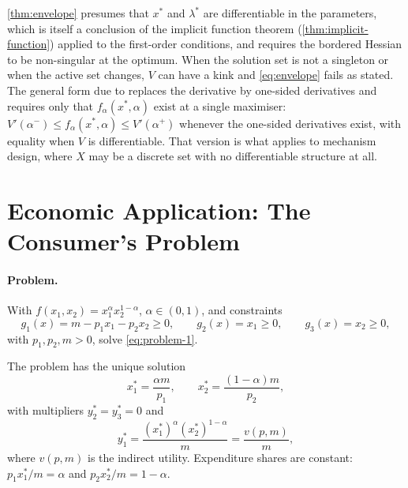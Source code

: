 \begin{remark}
	\label{rem:envelope-caveats}
	\autoref{thm:envelope} presumes that $x^\ast$ and $\lambda^\ast$ are
	differentiable in the parameters, which is itself a conclusion of the implicit
	function theorem (\autoref{thm:implicit-function}) applied to the first-order
	conditions, and requires the bordered Hessian to be non-singular at the optimum.
	When the solution set is not a singleton or when the active set changes, $V$ can
	have a kink and \eqref{eq:envelope} fails as stated. The general form due to
	\textcite{milgrom2002envelope} replaces the derivative by one-sided derivatives
	and requires only that $f_\alpha(x^\ast,\alpha)$ exist at a single maximiser:
	$V'(\alpha^-)\leq f_\alpha(x^\ast,\alpha)\leq V'(\alpha^+)$ whenever the
	one-sided derivatives exist, with equality when $V$ is differentiable. That
	version is what applies to mechanism design, where $X$ may be a discrete set
	with no differentiable structure at all.
\end{remark}

\section{Economic Application: The Consumer's Problem}\label{sec:opt-consumer}

\paragraph{Problem.} With $f(x_1,x_2)=x_1^{\alpha}x_2^{1-\alpha}$,
$\alpha\in(0,1)$, and constraints
\[
	g_1(x)=m-p_1x_1-p_2x_2\geq0,\qquad g_2(x)=x_1\geq0,\qquad g_3(x)=x_2\geq0,
\]
with $p_1,p_2,m>0$, solve \eqref{eq:problem-1}.

\begin{proposition}\label{prop:cobb-douglas-demand}
	The problem has the unique solution
	\begin{equation}\label{eq:cobb-douglas-demand}
		x_1^\ast=\frac{\alpha m}{p_1},\qquad x_2^\ast=\frac{(1-\alpha)m}{p_2},
	\end{equation}
	with multipliers $y_2^\ast=y_3^\ast=0$ and
	\begin{equation}\label{eq:cobb-douglas-multiplier}
		y_1^\ast=\frac{(x_1^\ast)^{\alpha}(x_2^\ast)^{1-\alpha}}{m}
		=\frac{v(p,m)}{m},
	\end{equation}
	where $v(p,m)$ is the indirect utility. Expenditure shares are constant:
	$p_1x_1^\ast/m=\alpha$ and $p_2x_2^\ast/m=1-\alpha$.
\end{proposition}

